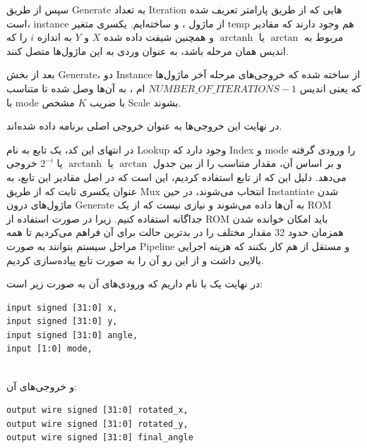 \documentclass[12pt,titlepage,a4page , tikz , multi,table , svgnames,xcdraw]{article}
\DeclareMathOperator\arctanh{arctanh}
\begin{document}
سپس از طریق Generate به تعداد Iteration هایی که از طریق پارامتر تعریف شده است، instance از ماژول ،  و  ساخته‌ایم. یکسری متغیر temp هم وجود دارند که مقادیر مربوط به $\arctan$ یا $\arctanh$ و همچنین شیفت داده شده $X$ و $Y$ به اندازه $i$ را که اندیس همان مرحله باشد، به عنوان وردی به این ماژول‌ها متصل کنند.

بعد از بخش Generate، دو Instance از  ساخته شده که خروجی‌های مرحله آخر ماژول‌ها که یعنی اندیس
$NUMBER\_OF\_ITERATIONS - 1$
ام
 ،
   به آن‌ها وصل شده تا متناسب با mode با ضریب $K$ مشخص Scale بشوند.

در نهایت این خروجی‌ها به عنوان خروجی اصلی برنامه داده شده‌اند.

در انتهای این کد، یک تابع به نام Lookup وجود دارد که Index و mode را ورودی گرفته و بر اساس آن، مقدار متناسب را از بین جدول $\arctan$ یا $\arctanh$ یا $2^{-i}$ خروجی می‌دهد. دلیل این که از تابع استفاده کردیم، این است که در اصل مقادیر این تابع، به عنوان یکسری ثابت که از طریق Mux انتخاب می‌شوند، در حین Instantiate شدن ماژول‌های درون Generate به آن‌ها داده می‌شوند و نیازی نیست که از یک ROM جداگانه استفاده کنیم. زیرا در صورت استفاده از ROM باید امکان خوانده شدن همزمان حدود 32 مقدار مختلف را در بدترین حالت برای آن فراهم می‌کردیم تا همه مراحل سیستم بتوانند به صورت Pipeline و مستقل از هم کار بکنند که هزینه اجرایی بالایی داشت و از این رو آن را به صورت تابع پیاده‌سازی کردیم.


\hrulefill

در نهایت یک  با نام  داریم که ورودی‌های آن به صورت زیر است:

\begin{latin}

\begin{verbatim}
input signed [31:0] x,
input signed [31:0] y,
input signed [31:0] angle,
input [1:0] mode,
   
\end{verbatim}

\end{latin}


و خروجی‌های آن:


\begin{latin}

\begin{verbatim}
output wire signed [31:0] rotated_x,
output wire signed [31:0] rotated_y,
output wire signed [31:0] final_angle
   
\end{verbatim}

\end{latin}
\end{document}
